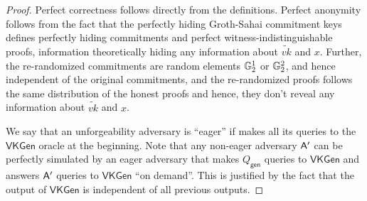 \begin{proof}
Perfect correctness follows directly from the definitions. Perfect anonymity follows from the fact that the perfectly hiding Groth-Sahai commitment keys defines perfectly hiding commitments and perfect witness-indistinguishable proofs, information theoretically hiding any information about $\widetilde{vk}$ and $x$. Further, the re-randomized commitments are random elements $\mathbb{G}_2^1$ or $\mathbb{G}_2^2$, and hence independent of the original commitments, and the re-randomized proofs follows the same distribution of the honest proofs and hence, they don't reveal any information about $\widetilde{vk}$ and $x$.

We say that an unforgeability adversary is ``eager'' if  makes all its queries to the $\mathsf{VKGen}$ oracle at the beginning. Note that any non-eager adversary $\mathsf{A}'$ can be perfectly simulated  by an eager adversary that makes ${Q_\mathsf{gen}}$ queries to $\mathsf{VKGen}$ and answers $\mathsf{A}'$ queries to $\mathsf{VKGen}$ ``on demand''. This is justified by the fact that the output of $\mathsf{VKGen}$ is independent of all previous outputs.


\end{proof}
